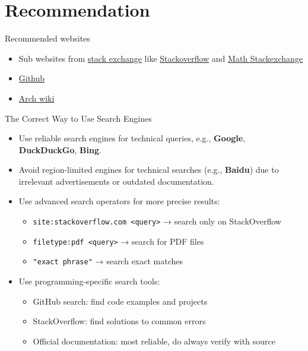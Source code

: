 \section{Recommendation}

\begin{frame}[fragile]{Recommended websites}
	\begin{itemize}
		\item Sub websites from \href{https://stackexchange.com/}{stack exchange} like \href{https://stackoverflow.com/}{Stackoverflow} and \href{https://math.stackexchange.com/}{Math Stackexchange}
		\item \href{https://github.com/}{Github}
		\item \href{https://wiki.archlinux.org/}{Arch wiki}
	\end{itemize}
\end{frame}

\begin{frame}[fragile]{The Correct Way to Use Search Engines}
	\begin{itemize}
		\item Use reliable search engines for technical queries, e.g., \textbf{Google}, \textbf{DuckDuckGo}, \textbf{Bing}.
		\item Avoid region-limited engines for technical searches (e.g., \textbf{Baidu}) due to irrelevant advertisements or outdated documentation.
		\item Use advanced search operators for more precise results:
			\begin{itemize}
				\item \texttt{site:stackoverflow.com <query>} → search only on StackOverflow
				\item \texttt{filetype:pdf <query>} → search for PDF files
				\item \texttt{"exact phrase"} → search exact matches
			\end{itemize}
		\item Use programming-specific search tools:
			\begin{itemize}
				\item GitHub search: find code examples and projects
				\item StackOverflow: find solutions to common errors
				\item Official documentation: most reliable, do always verify with source
			\end{itemize}
	\end{itemize}
\end{frame}

